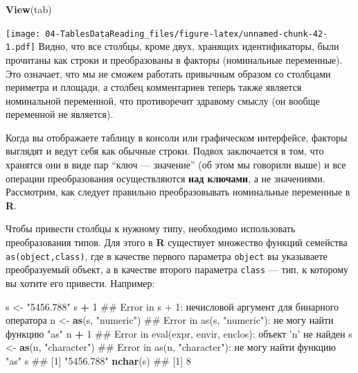 \documentclass[]{book}
\newenvironment{Shaded}{\begin{snugshade}}{\end{snugshade}}
\newcommand{\KeywordTok}[1]{\textcolor[rgb]{0.13,0.29,0.53}{\textbf{#1}}}
\newcommand{\DecValTok}[1]{\textcolor[rgb]{0.00,0.00,0.81}{#1}}
\newcommand{\StringTok}[1]{\textcolor[rgb]{0.31,0.60,0.02}{#1}}
\newcommand{\OperatorTok}[1]{\textcolor[rgb]{0.81,0.36,0.00}{\textbf{#1}}}
\newcommand{\NormalTok}[1]{#1}
\begin{document}
\begin{Shaded}
\begin{Highlighting}[]
\KeywordTok{View}\NormalTok{(tab)}
\end{Highlighting}
\end{Shaded}

\texttt{[image: 04-TablesDataReading\_files/figure-latex/unnamed-chunk-42-1.pdf]}
Видно, что все столбцы, кроме двух, хранящих идентификаторы, были
прочитаны как строки и преобразованы в факторы (номинальные переменные).
Это означает, что мы не сможем работать привычным образом со столбцами
периметра и площади, а столбец комментариев теперь также является
номинальной переменной, что противоречит здравому смыслу (он вообще
переменной не является).

Когда вы отображаете таблицу в консоли или графическом интерфейсе,
факторы выглядят и ведут себя как обычные строки. Подвох заключается в
том, что хранятся они в виде пар ``ключ --- значение'' (об этом мы
говорили выше) и все операции преобразования осуществляются \textbf{над
ключами}, а не значениями. Рассмотрим, как следует правильно
преобразовывать номинальные переменные в \textbf{R}.

Чтобы привести столбцы к нужному типу, необходимо использовать
преобразования типов. Для этого в \textbf{R} существует множество
функций семейства \texttt{as(object,class)}, где в качестве первого
параметра \texttt{object} вы указываете преобразуемый объект, а в
качестве второго параметра \texttt{class} --- тип, к которому вы хотите
его привести. Например:

\begin{Shaded}
\begin{Highlighting}[]
\NormalTok{s <-}\StringTok{ "5456.788"}
\NormalTok{s }\OperatorTok{+}\StringTok{ }\DecValTok{1}
\NormalTok{## Error in s + 1: нечисловой аргумент для бинарного оператора}
\NormalTok{n <-}\StringTok{ }\KeywordTok{as}\NormalTok{(s, }\StringTok{"numeric"}\NormalTok{)}
\NormalTok{## Error in as(s, "numeric"): не могу найти функцию "as"}
\NormalTok{n }\OperatorTok{+}\StringTok{ }\DecValTok{1}
\NormalTok{## Error in eval(expr, envir, enclos): объект 'n' не найден}
\NormalTok{s <-}\StringTok{ }\KeywordTok{as}\NormalTok{(n, }\StringTok{"character"}\NormalTok{)}
\NormalTok{## Error in as(n, "character"): не могу найти функцию "as"}
\NormalTok{s}
\NormalTok{## [1] "5456.788"}
\KeywordTok{nchar}\NormalTok{(s)}
\NormalTok{## [1] 8}
\end{Highlighting}
\end{Shaded}
\end{document}
